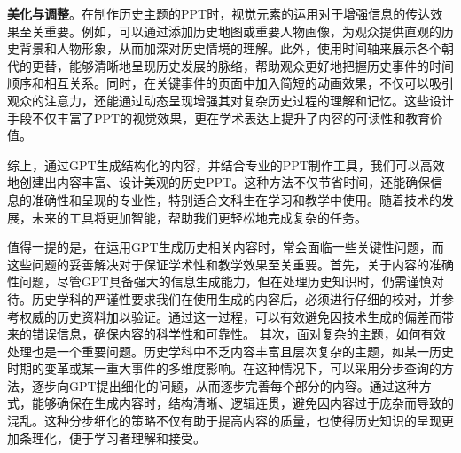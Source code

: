 
\textbf{美化与调整}。在制作历史主题的PPT时，视觉元素的运用对于增强信息的传达效果至关重要。例如，可以通过添加历史地图或重要人物画像，为观众提供直观的历史背景和人物形象，从而加深对历史情境的理解。此外，使用时间轴来展示各个朝代的更替，能够清晰地呈现历史发展的脉络，帮助观众更好地把握历史事件的时间顺序和相互关系。同时，在关键事件的页面中加入简短的动画效果，不仅可以吸引观众的注意力，还能通过动态呈现增强其对复杂历史过程的理解和记忆。这些设计手段不仅丰富了PPT的视觉效果，更在学术表达上提升了内容的可读性和教育价值。

综上，通过GPT生成结构化的内容，并结合专业的PPT制作工具，我们可以高效地创建出内容丰富、设计美观的历史PPT。这种方法不仅节省时间，还能确保信息的准确性和呈现的专业性，特别适合文科生在学习和教学中使用。随着技术的发展，未来的工具将更加智能，帮助我们更轻松地完成复杂的任务。

值得一提的是，在运用GPT生成历史相关内容时，常会面临一些关键性问题，而这些问题的妥善解决对于保证学术性和教学效果至关重要。首先，关于内容的准确性问题，尽管GPT具备强大的信息生成能力，但在处理历史知识时，仍需谨慎对待。历史学科的严谨性要求我们在使用生成的内容后，必须进行仔细的校对，并参考权威的历史资料加以验证。通过这一过程，可以有效避免因技术生成的偏差而带来的错误信息，确保内容的科学性和可靠性。
其次，面对复杂的主题，如何有效处理也是一个重要问题。历史学科中不乏内容丰富且层次复杂的主题，如某一历史时期的变革或某一重大事件的多维度影响。在这种情况下，可以采用分步查询的方法，逐步向GPT提出细化的问题，从而逐步完善每个部分的内容。通过这种方式，能够确保在生成内容时，结构清晰、逻辑连贯，避免因内容过于庞杂而导致的混乱。这种分步细化的策略不仅有助于提高内容的质量，也使得历史知识的呈现更加条理化，便于学习者理解和接受。
